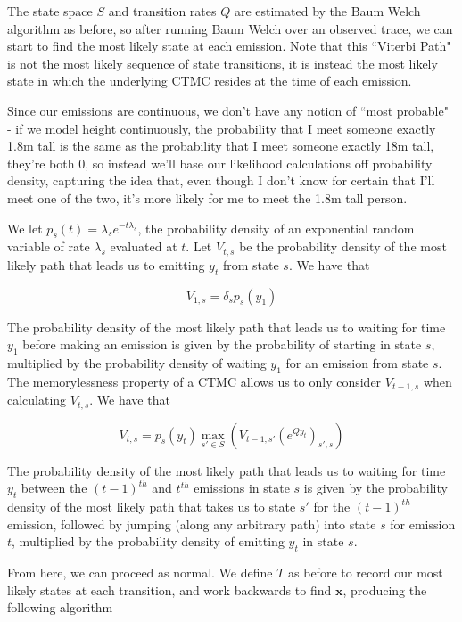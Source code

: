 The state space $S$ and transition rates $Q$ are estimated by the Baum Welch algorithm as before, so after running Baum Welch over an observed trace, we can start to find the most likely state at each emission. Note that this ``Viterbi Path" is not the most likely sequence of state transitions, it is instead the most likely state in which the underlying CTMC resides at the time of each emission. 

Since our emissions are continuous, we don't have any notion of ``most probable" - if we model height continuously, the probability that I meet someone exactly 1.8m tall is the same as the probability that I meet someone exactly 18m tall, they're both 0, so instead we'll base our likelihood calculations off probability density, capturing the idea that, even though I don't know for certain that I'll meet one of the two, it's more likely for me to meet the 1.8m tall person.

We let $p_s(t)= \lambda_s e^{-t\lambda_s}$, the probability density of an exponential random variable of rate $\lambda_s$ evaluated at $t$. Let $V_{t,s}$ be the probability density of the most likely path that leads us to emitting $y_t$ from state $s$. We have that

$$
V_{1,s} =  \delta_{s}p_s(y_1)
$$

The probability density of the most likely path that leads us to waiting for time $y_1$ before making an emission is given by the probability of starting in state $s$, multiplied by the probability density of waiting $y_1$ for an emission from state $s$. The memorylessness property of a CTMC allows us to only consider $V_{t-1,s}$ when calculating $V_{t,s}$. We have that

$$
V_{t,s} = p_s(y_t) \max_{s'\in S} (V_{t-1,s'}(e^{Qy_t})_{s',s})
$$

The probability density of the most likely path that leads us to waiting for time $y_t$ between the $(t-1)^{th}$ and $t^{th}$ emissions in state $s$ is given by the probability density of the most likely path that takes us to state $s'$ for the $(t-1)^{th}$ emission, followed by jumping (along any arbitrary path) into state $s$ for emission $t$, multiplied by the probability density of emitting $y_t$ in state $s$.

From here, we can proceed as normal. We define $T$ as before to record our most likely states at each transition, and work backwards to find $\mathbf{x}$, producing the following algorithm

